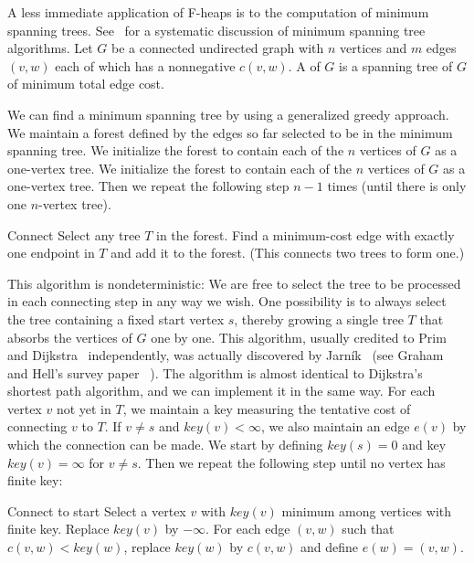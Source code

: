 A less immediate application of F-heaps is to the computation of minimum spanning
trees. See~\cite{Tarjan1983} for a systematic discussion of minimum spanning tree
algorithms. Let \(G\) be a connected undirected graph with \(n\) vertices and \(m\)
edges \((v, w)\) each of which has a nonnegative  \(c(v, w)\).
A  of \(G\) is a spanning tree of \(G\) of minimum total
edge cost.

We can find a minimum spanning tree by using a generalized greedy approach. We
maintain a forest defined by the edges so far selected to be in the minimum spanning
tree. We initialize the forest to contain each of the \(n\) vertices of \(G\) as
a one-vertex tree. We initialize the forest to contain each of the \(n\) vertices of
\(G\) as a one-vertex tree. Then we repeat the following step \(n - 1\) times (until
there is only one \(n\)-vertex tree).

\begin{step}{Connect}
	Select any tree \(T\) in the forest. Find a minimum-cost edge with exactly one
	endpoint in \(T\) and add it to the forest. (This connects two trees to form
	one.)
\end{step}

This algorithm is nondeterministic: We are free to select the tree to be processed in
each connecting step in any way we wish. One possibility is to always select the tree
containing a fixed start vertex \(s\), thereby growing a single tree \(T\) that
absorbs the vertices of \(G\) one by one. This algorithm, usually credited to Prim~%
\cite{Prim1957} and Dijkstra~\cite{Dijkstra1959} independently, was actually
discovered by Jarník~\cite{Jarnik1930} (see Graham and Hell's survey paper~%
\cite{GrahamHell1985}). The algorithm is almost identical to Dijkstra's shortest path
algorithm, and we can implement it in the same way. For each vertex \(v\) not yet in
\(T\), we maintain a key measuring the tentative cost of connecting \(v\) to \(T\).
If \(v \neq s\) and \(key(v) < \infty\), we also maintain an edge \(e(v)\) by which
the connection can be made. We start by defining \(key(s) = 0\) and key \(key(v)
= \infty\) for \(v \neq s\). Then we repeat the following step until no vertex has
finite key:

\begin{step}{Connect to start}
	Select a vertex \(v\) with \(key(v)\) minimum among vertices with finite key.
	Replace \(key(v)\) by \(-\infty\). For each edge \((v, w)\) such that \(c(v, w)
	< key(w)\), replace \(key(w)\) by \(c(v, w)\) and define \(e(w) = (v, w)\).
\end{step}

